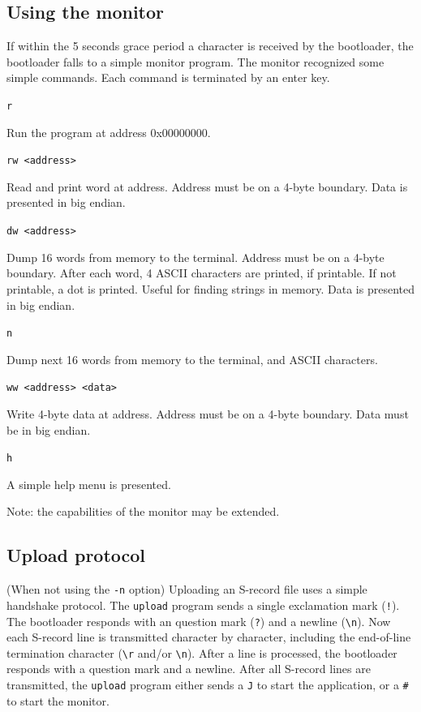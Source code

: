 \documentclass[12pt]{article}
\begin{document}
\subsection{Using the monitor}
If within the 5 seconds grace period a character is received by the bootloader, the bootloader falls to a simple monitor program. The monitor recognized some simple commands. Each command is terminated by an enter key.

\lstinline|r|

Run the program at address 0x00000000.

\lstinline|rw <address>|

Read and print word at address. Address must be on a 4-byte boundary. Data is presented in big endian.

\lstinline|dw <address>|

Dump 16 words from memory to the terminal. Address must be on a 4-byte boundary. After each word, 4 ASCII characters are printed, if printable. If not printable, a dot is printed. Useful for finding strings in memory. Data is presented in big endian.

\lstinline|n|

Dump next 16 words from memory to the terminal, and ASCII characters.

\lstinline|ww <address> <data>|

Write 4-byte data at address. Address must be on a 4-byte boundary. Data must be in big endian.

\lstinline|h|

A simple help menu is presented.

Note: the capabilities of the monitor may be extended.

\subsection{Upload protocol}
(When not using the \lstinline|-n| option) Uploading an S-record file uses a simple handshake protocol. The \lstinline|upload| program sends a single exclamation mark (\lstinline|!|). The bootloader responds with an question mark (\lstinline|?|) and a newline (\lstinline|\n|). Now each S-record line is transmitted character by character, including the end-of-line termination character (\lstinline|\r| and/or \lstinline|\n|). After a line is processed, the bootloader responds with a question mark and a newline. After all S-record lines are transmitted, the \lstinline|upload| program either sends a \lstinline|J| to start the application, or a \lstinline|#| to start the monitor.
\end{document}
